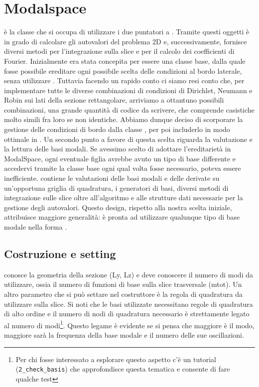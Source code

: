 \section{Modalspace}
 \`e la classe che si occupa di utilizzare i due puntatori a .
Tramite questi oggetti \`e in grado di calcolare gli autovalori del problema 2D e, successivamente,
fornisce diversi metodi per l'integrazione sulla slice e per il calcolo dei coefficienti di Fourier.
Inizialmente  era stata concepita per essere una classe base, 
dalla quale fosse possibile ereditare ogni possibile scelta delle condizioni al bordo laterale, senza utilizzare . 
Tuttavia facendo un rapido conto ci siamo resi conto che, per implementare tutte le diverse combinazioni di condizioni 
di Dirichlet, Neumann e Robin sui lati della sezione rettangolare, arriviamo a ottantuno possibili combinazioni, 
una grande quantit\`a di codice da scrivere, che comprende casistiche molto simili fra loro se non identiche. 
Abbiamo dunque deciso di scorporare la gestione delle condizioni di bordo dalla classe , 
per poi includerlo in modo ottimale in . 
Un secondo punto a favore di questa scelta riguarda la valutazione e la lettura delle basi modali.
Se avessimo scelto di adottare l'ereditariet\`a in ModalSpace, ogni eventuale 
figlia avrebbe avuto un tipo di base differente e accedervi tramite la classe base ogni qual volta 
fosse necessario, poteva essere inefficiente.  contiene le valutazioni delle basi modali e delle derivate 
su un'opportuna griglia di quadratura, i generatori di basi, diversi metodi di integrazione sulle slice oltre all'algoritmo e alle strutture dati necessarie
per la gestione degli autovalori. Questo design, rispetto alla nostra scelta iniziale, attribuisce maggiore 
generalit\`a:  \`e pronta ad utilizzare qualunque tipo di base modale nella forma .

\subsection{Costruzione e setting}
 conosce la geometria della sezione (Ly, Lz) e deve conoscere il numero di modi da utilizzare, ossia il numero di funzioni di base sulla slice trasversale (mtot). 
Un altro parametro che si pu\`o settare nel costruttore \`e la regola di quadratura da utilizzare sulla slice. 
Si noti che le basi utilizzate necessitano regole di quadratura di alto ordine e il numero di nodi di quadratura necessario
\`e strettamente legato al numero di modi\footnote{Per chi fosse interessato a esplorare questo aspetto c'\`e un tutorial (\texttt{2\_check\_basis}) che approfondisce questa
tematica e consente di fare qualche test}.
Questo legame \`e evidente se si pensa che maggiore \`e il modo, 
maggiore sar\`a la frequenza della base modale e il numero delle sue oscillazioni. 

